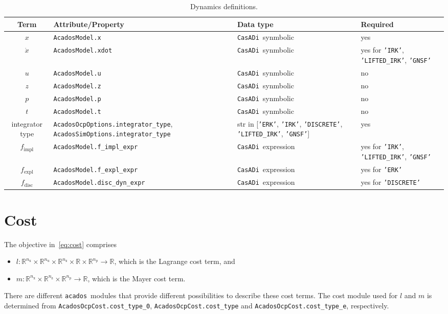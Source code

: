 \documentclass[english]{article}
\newcommand{\code}[1]{\texttt{#1}}
\newcommand{\casadi}{\texttt{CasADi}}
\newcommand{\acados}{\texttt{acados}}
\newcommand{\ind}[1]{_{\textrm{#1}}}
\newcommand{\nx}{n\ind{x}}
\newcommand{\nuu}{n\ind{u}}
\newcommand{\nz}{n\ind{z}}
\newcommand{\np}{n\ind{p}}
\newcommand{\mandatory}{yes}
\newcommand{\optional}{no}
\begin{document}
%
\begin{table}[ht!]
\centering
\begin{tabular}{c@{}C{6.7cm}@{}C{5cm}@{}C{3.4cm}}
\toprule
Term & Attribute/Property & Data type & Required \\ \midrule
$x$ & \code{AcadosModel.x} & \casadi~synmbolic & \mandatory \\[3pt]
$\dot{x}$ & \code{AcadosModel.xdot} & \casadi~synmbolic & \mandatory{} for \code{'IRK'}, \code{'LIFTED\_IRK'}, \code{'GNSF'}  \\[3pt]
$u$ & \code{AcadosModel.u} & \casadi~synmbolic & \optional \\[3pt]
$z$ & \code{AcadosModel.z} & \casadi~synmbolic & \optional \\[3pt]
$p$ & \code{AcadosModel.p} & \casadi~synmbolic & \optional \\[3pt]
$t$ & \code{AcadosModel.t} & \casadi~synmbolic & \optional \\[3pt]
\midrule
integrator type & \code{AcadosOcpOptions.integrator\_type},  \code{AcadosSimOptions.integrator\_type} & str in [\code{'ERK'}, \code{'IRK'}, \code{'DISCRETE'}, \code{'LIFTED\_IRK'}, \code{'GNSF'}] & \mandatory \\[3pt]
\midrule
$ f\ind{impl}$ & \code{AcadosModel.f\_impl\_expr} & \casadi~expression & \mandatory{} for \code{'IRK'}, \code{'LIFTED\_IRK'}, \code{'GNSF'} \\[3pt]
$ f\ind{expl}$ & \code{AcadosModel.f\_expl\_expr} & \casadi~expression & \mandatory{} for \code{'ERK'} \\[3pt]
$f\ind{disc}$ & \code{AcadosModel.disc\_dyn\_expr} & \casadi~expression & \mandatory{} for \code{'DISCRETE'}\\[3pt]
\bottomrule
\end{tabular}
\caption{Dynamics definitions.} \label{tab:dynamics}
\end{table}
%
\section{Cost}\label{sec:cost}
%
The objective in~\eqref{eq:cost} comprises
\begin{itemize}
\item $ l: \mathbb{R}^{\nx}\times\mathbb{R}^{\nuu}\times\mathbb{R}^{\nz}\times\mathbb{R}\times\mathbb{R}^{\np} \rightarrow \mathbb{R}$, which is the Lagrange cost term, and
\item $ m: \mathbb{R}^{\nx}\times\mathbb{R}^{\nz}\times\mathbb{R}^{\np} \rightarrow \mathbb{R}$, which is the Mayer cost term.
\end{itemize}
There are different \acados~modules that provide different possibilities to describe these cost terms.
The cost module used for $l$ and $m$ is determined from \code{AcadosOcpCost.cost\_type\_0}, \code{AcadosOcpCost.cost\_type} and \code{AcadosOcpCost.cost\_type\_e}, respectively.
\end{document}
